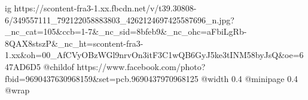  
 
 
 
 

\ifcmt
  ig https://scontent-fra3-1.xx.fbcdn.net/v/t39.30808-6/349557111_792122058883803_4262124697425587696_n.jpg?_nc_cat=105&ccb=1-7&_nc_sid=8bfeb9&_nc_ohc=aFbiLgRb-8QAX8stszP&_nc_ht=scontent-fra3-1.xx&oh=00_AfCVyOBzWGl9nrvOn3itF3C1wQB6GyJ5ke3tINM58byJsQ&oe=647AD6D5
	@childof https://www.facebook.com/photo?fbid=9690437630968159&set=pcb.9690437970968125
  @width 0.4
  @minipage 0.4
  @wrap \parpic[r]
\fi
